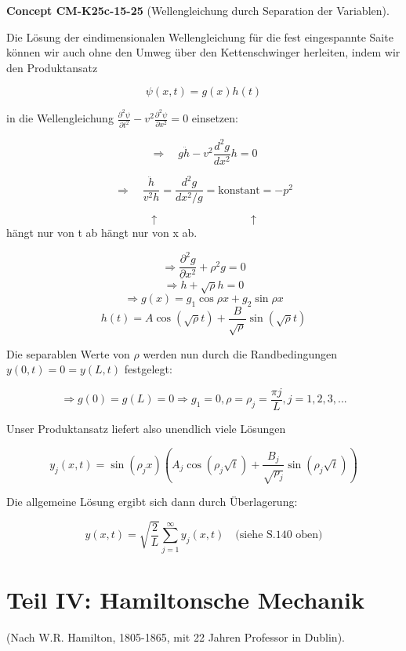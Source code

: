 \documentclass[10pt, letterpaper]{article}
\newcommand{\CustomHeading}[3]{%
  \par\medskip\noindent%
  \textbf{#1 #2} \textnormal{(#3)}.\enskip%
}
\newenvironment{CONC}[2]{\begin{unitbox}\CustomHeading{Concept}{#1}{#2}}{\end{unitbox}}
\begin{document}
\begin{CONC}{CM-K25c-15-25}{Wellengleichung durch Separation der Variablen}
Die Lösung der eindimensionalen Wellengleichung für die fest eingespannte Saite können wir auch ohne den Umweg über den Kettenschwinger herleiten, indem wir den Produktansatz

\[\psi(x,t) = g(x)h(t)\]

in die Wellengleichung $\frac{\partial^2\psi}{\partial t^2} - v^2\frac{\partial^2\psi}{\partial x^2} = 0$ einsetzen:

\[\Rightarrow \quad g\ddot{h} - v^2\frac{d^2g}{dx^2}h = 0\]

\[\Rightarrow \quad \frac{\ddot{h}}{v^2h} = \frac{d^2g}{dx^2/g} = \text{konstant} = -p^2\]

\[\uparrow \qquad\qquad\qquad\qquad \uparrow\]
hängt nur von t ab \qquad hängt nur von x ab.

\[
\Rightarrow \frac{\partial^2 g}{\partial x^2} + \rho^2 g = 0
\]
\[
\Rightarrow \ddot{h} + \sqrt{\rho} h = 0
\]
\[
\Rightarrow g(x) = g_1 \cos \rho x + g_2 \sin \rho x
\]
\[
h(t) = A \cos(\sqrt{\rho}t) + \frac{B}{\sqrt{\rho}} \sin(\sqrt{\rho}t)
\]

Die separablen Werte von $\rho$ werden nun durch die Randbedingungen $y(0,t) = 0 = y(L,t)$ festgelegt:

\[
\Rightarrow g(0) = g(L) = 0 \Rightarrow g_1 = 0, \rho = \rho_j = \frac{\pi j}{L}, j=1,2,3,...
\]

Unser Produktansatz liefert also unendlich viele Lösungen

\[
y_j(x,t) = \sin(\rho_j x)\left(A_j \cos(\rho_j \sqrt{t}) + \frac{B_j}{\sqrt{\rho_j}} \sin(\rho_j \sqrt{t})\right)
\]

Die allgemeine Lösung ergibt sich dann durch Überlagerung:

\[
y(x,t) = \sqrt{\frac{2}{L}} \sum_{j=1}^{\infty} y_j(x,t) \quad \text{(siehe S.140 oben)}
\]
\end{CONC}







\pagebreak



\section{Teil IV: Hamiltonsche Mechanik}

(Nach W.R. Hamilton, 1805-1865, mit 22 Jahren Professor in Dublin).
\end{document}
